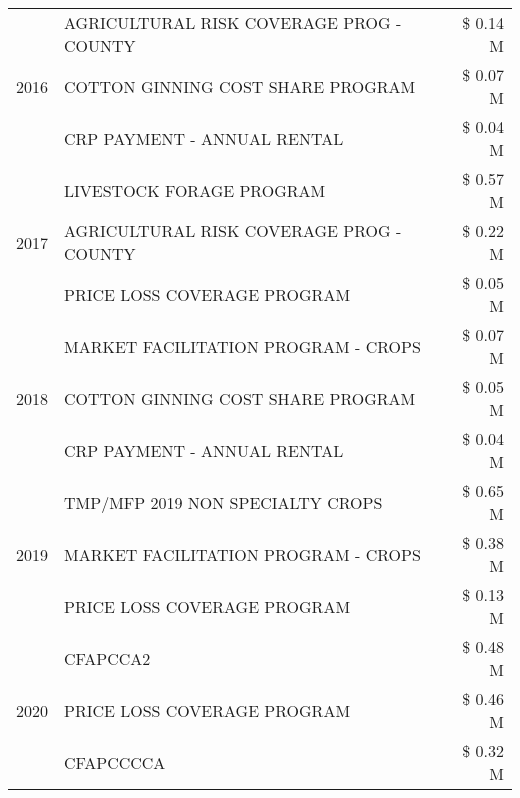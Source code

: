 \begin{tabular}{llr}
\cline{1-3}
\multirow[t]{3}{*}{2016} & AGRICULTURAL RISK COVERAGE PROG - COUNTY      & \$ 0.14 M \\
 & COTTON GINNING COST SHARE PROGRAM             & \$ 0.07 M \\
 & CRP PAYMENT - ANNUAL RENTAL                   & \$ 0.04 M \\
\cline{1-3}
\multirow[t]{3}{*}{2017} & LIVESTOCK FORAGE PROGRAM & \$ 0.57 M \\
 & AGRICULTURAL RISK COVERAGE PROG - COUNTY & \$ 0.22 M \\
 & PRICE LOSS COVERAGE PROGRAM & \$ 0.05 M \\
\cline{1-3}
\multirow[t]{3}{*}{2018} & MARKET FACILITATION PROGRAM - CROPS & \$ 0.07 M \\
 & COTTON GINNING COST SHARE PROGRAM & \$ 0.05 M \\
 & CRP PAYMENT - ANNUAL RENTAL & \$ 0.04 M \\
\cline{1-3}
\multirow[t]{3}{*}{2019} & TMP/MFP 2019 NON SPECIALTY CROPS & \$ 0.65 M \\
 & MARKET FACILITATION PROGRAM - CROPS & \$ 0.38 M \\
 & PRICE LOSS COVERAGE PROGRAM & \$ 0.13 M \\
\cline{1-3}
\multirow[t]{3}{*}{2020} & CFAPCCA2 & \$ 0.48 M \\
 & PRICE LOSS COVERAGE PROGRAM & \$ 0.46 M \\
 & CFAPCCCCA & \$ 0.32 M \\
\cline{1-3}
\bottomrule
\end{tabular}
